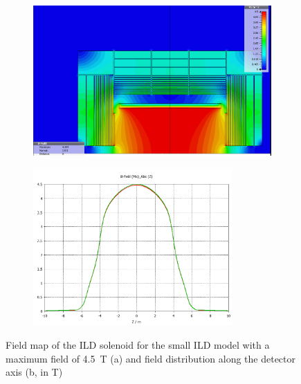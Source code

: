 \begin{figure}[t]
\begin{center}
\begin{subfigure}{0.75\hsize} \includegraphics[width=\textwidth]{Integration/fig/field_small_4_5.png}
\caption{ \label{ild:fig:magnet_small_map}}
 \end{subfigure}
\hspace{0.03\textwidth}
\begin{subfigure}{0.75\hsize} \includegraphics[width=\textwidth, height = 6cm]{Integration/fig/field_small_4_5_plot.png}
\caption{  \label{ild:fig:magnet_small_field}}
 \end{subfigure}
\end{center}
\caption{Field map of the ILD solenoid for the small ILD model with a maximum field of 4.5~T (a) and field distribution along the detector axis (b, in T)~\cite{ild:bib:Magnet_Simulations}}
\label{ILD:fig:magnet_small}
\end{figure}


